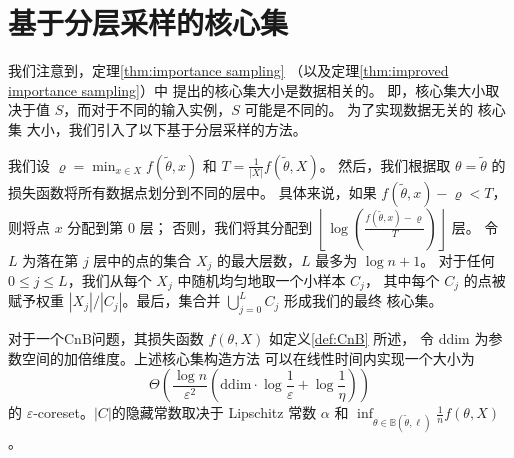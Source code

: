 \section{基于分层采样的核心集}

我们注意到，定理\ref{thm:importance sampling} （以及定理\ref{thm:improved importance sampling}）中
提出的核心集大小是数据相关的。
即，核心集大小取决于值 $S$，而对于不同的输入实例，$S$ 可能是不同的。
为了实现数据无关的 核心集 大小，我们引入了以下基于分层采样的方法。


我们设 $\varrho = \min_{x \in X} f(\tilde{\theta}, x)$ 和 $T = \frac{1}{|X|} f(\tilde{\theta}, X)$。
然后，我们根据取 $\theta=\tilde{\theta}$ 的损失函数将所有数据点划分到不同的层中。
具体来说，如果 $f(\tilde{\theta}, x) - \varrho < T$，则将点 $x$ 分配到第 0 层；
否则，我们将其分配到 $\left\lfloor \log \left( \frac{f(\tilde{\theta}, x) - \varrho}{T} \right) \right\rfloor$ 层。
令 $L$ 为落在第 $j$ 层中的点的集合 $X_j$ 的最大层数，$L$ 最多为 $\log n + 1$。
对于任何 $0 \leq j \leq L$，我们从每个 $X_j$ 中随机均匀地取一个小样本 $C_j$，
其中每个 $C_j$ 的点被赋予权重 $|X_j| / |C_j|$。最后，集合并 $\bigcup_{j=0}^{L} C_j$ 形成我们的最终 核心集。

\begin{theorem}
    对于一个CnB问题，其损失函数 $f(\theta, X)$ 如定义\ref{def:CnB} 所述，
    令 ddim 为参数空间的加倍维度。上述核心集构造方法
    可以在线性时间内实现一个大小为
    \begin{equation*}
    \Theta \left( \frac{\log n}{\varepsilon^2} \left( \text{ddim} \cdot \log \frac{1}{\varepsilon} + \log \frac{1}{\eta} \right) \right)
    \end{equation*}
    的 $\varepsilon$-coreset。$|C|$的隐藏常数取决于 Lipschitz 常数 $\alpha$ 和 $\inf_{\theta \in \mathbb{B}(\tilde{\theta}, \ell)} \frac{1}{n} f(\theta, X)$。    
\end{theorem}


